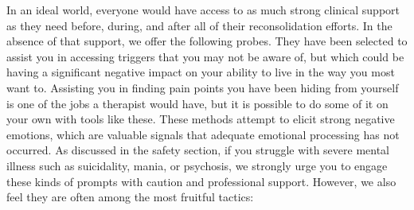 \documentclass[12pt,letterpaper]{article}
\begin{document}
In an ideal world, everyone would have access to as much strong clinical support as they need before, during, and after all of their reconsolidation efforts. In the absence of that support, we offer the following probes. They have been selected to assist you in accessing triggers that you may not be aware of, but which could be having a significant negative impact on your ability to live in the way you most want to. Assisting you in finding pain points you have been hiding from yourself is one of the jobs a therapist would have, but it is possible to do some of it on your own with tools like these. These methods attempt to elicit strong negative emotions, which are valuable signals that adequate emotional processing has not occurred. As discussed in the safety section, if you struggle with severe mental illness such as suicidality, mania, or psychosis, we strongly urge you to engage these kinds of prompts with caution and professional support. However, we also feel they are often among the most fruitful tactics:
\end{document}
